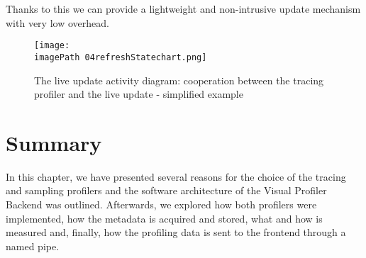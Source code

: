 Thanks to this we can provide a lightweight and non-intrusive update mechanism with very low overhead. 

\begin{figure}
	\centering
		\texttt{[image: \\imagePath 04refreshStatechart.png]}
		\caption{The live update activity diagram: cooperation between the tracing profiler and the live update  - simplified example }
	\label{fig:04refreshStatechart}
\end{figure}

 
\section{Summary}
In this chapter, we have presented several reasons for the choice of the tracing and sampling profilers and the software architecture of the Visual Profiler Backend was outlined. Afterwards, we explored how both profilers were implemented, how the metadata is acquired and stored, what and how is measured and, finally, how the profiling data is sent to the frontend through a named pipe.






